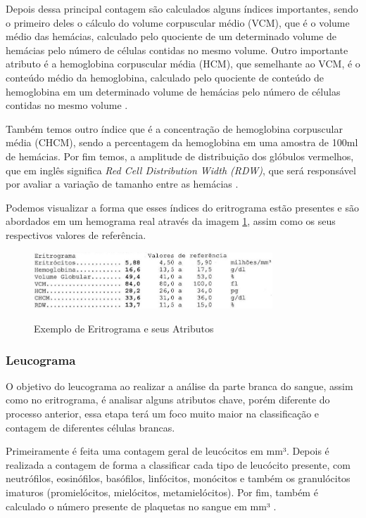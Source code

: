 Depois dessa principal contagem são calculados alguns índices importantes, sendo o primeiro deles o cálculo do volume corpuscular médio (VCM), que é o volume médio das hemácias, calculado pelo quociente de um determinado volume de hemácias pelo número de células contidas no mesmo volume. Outro importante atributo é a hemoglobina corpuscular média (HCM), que semelhante ao VCM, é o conteúdo médio da hemoglobina, calculado pelo quociente de conteúdo de hemoglobina em um determinado volume de hemácias pelo número de células contidas no mesmo volume \cite{interpretacaoHemograma, manualHematologia}.

Também temos outro índice que é a concentração de hemoglobina corpuscular média (CHCM), sendo a percentagem da hemoglobina em uma amostra de 100ml de hemácias. Por fim temos, a amplitude de distribuição dos glóbulos vermelhos, que em inglês significa \emph{Red Cell Distribution Width (RDW)}, que será responsável por avaliar a variação de tamanho entre as hemácias \cite{interpretacaoHemograma, manualHematologia}.

Podemos visualizar a forma que esses índices do eritrograma estão presentes e são abordados em um hemograma real através da imagem \ref{fig:eritrograma}, assim como os seus respectivos valores de referência.

\begin{figure}[!htb]
	\centering
	\caption{Exemplo de Eritrograma e seus Atributos}
	\includegraphics[width=0.80\textwidth]{img/eritrograma.jpg}
	\label{fig:eritrograma}
\end{figure}
 
\subsubsection{Leucograma}
O objetivo do leucograma ao realizar a análise da parte branca do sangue, assim como no eritrograma, é analisar alguns atributos chave, porém diferente do processo anterior, essa etapa terá um foco muito maior na classificação e contagem de diferentes células brancas.

Primeiramente é feita uma contagem geral de leucócitos em mm³. Depois é realizada a contagem de forma a classificar cada tipo de leucócito presente, com neutrófilos, eosinófilos, basófilos, linfócitos, monócitos e também os granulócitos imaturos (promielócitos, mielócitos, metamielócitos). Por fim, também é calculado o número presente de plaquetas no sangue em mm³ \cite{interpretacaoHemograma, manualHematologia}.

